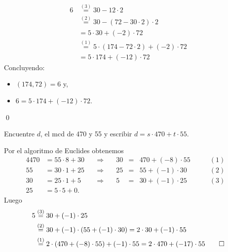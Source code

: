 \documentclass[handout]{beamer} %
\begin{document}
    
    
    \begin{frame}
        \begin{align*}
            6&\stackrel{(3)}{=}    30-12\cdot 2\\
            &\stackrel{(2)}{=}    30-(72-30\cdot 2)\cdot 2 \\  
            &=    5 \cdot 30 + (-2) \cdot 72\\  
            &\stackrel{(1)}{=} 5 \cdot (    174-72\cdot 2) + (-2) \cdot 72\\   
            &=  5\cdot 174+ (-12) \cdot 72  
        \end{align*}
        \pause
        Concluyendo: 
        \begin{itemize}
            \item     $(174,72) = 6$ y,
            \item  $6= 5\cdot 174+ (-12) \cdot 72$.
        \end{itemize}
        \qed
        
        \vskip 2cm
        
    \end{frame}
    
    \begin{frame}
        \begin{ejemplo} Encuentre $d$, el mcd de 470 y 55 y escribir $d = s \cdot 470 + t \cdot 55$.
        \end{ejemplo} \pause
        \begin{solucion}\pause
            Por el algoritmo de Euclides obtenemos
            \begin{alignat*}4
                470&=55 \cdot 8 +30&\quad\Rightarrow\quad &30 &=&470 + (-8)\cdot 55&\qquad (1)&\\
                55&=30 \cdot 1 + 25&\quad\Rightarrow\quad &25 &=&55 +(-1)\cdot 30&\qquad (2)&\\
                30&=25 \cdot 1+5&\quad\Rightarrow\quad &5 &=&30 +(-1) \cdot 25&\qquad (3)& \\
                25&=5\cdot 5+0.&&&&&&
            \end{alignat*}\pause
            Luego
            \begin{align*}
                5 &\stackrel{(3)}{=} 30 +(-1) \cdot 25\\
                &\stackrel{(2)}{=} 30 + (-1) \cdot (55 +(-1)\cdot 30) = 2 \cdot 30 + (-1) \cdot 55 \\   
                &\stackrel{(1)}{=}  2 \cdot (470 + (-8)\cdot 55) + (-1) \cdot 55 = 2 \cdot 470 +(-17)\cdot 55    \qed\\    
            \end{align*}
        
        \end{solucion}    
        
    \end{frame}
    
\end{document}
